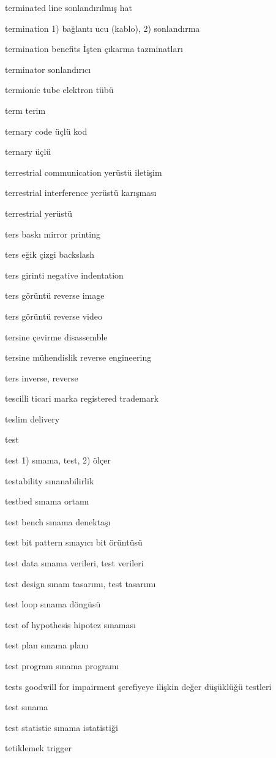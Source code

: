 \documentclass[12pt,fleqn]{article}\usepackage{../../common}
\begin{document}
terminated line sonlandırılmış hat

termination 1) bağlantı ucu (kablo), 2) sonlandırma

termination benefits İşten çıkarma tazminatları

terminator sonlandırıcı

termionic tube elektron tübü

term terim

ternary code üçlü kod

ternary üçlü

terrestrial communication yerüstü iletişim

terrestrial interference yerüstü karışması

terrestrial yerüstü

ters baskı mirror printing

ters eğik çizgi backslash

ters girinti negative indentation

ters görüntü reverse image

ters görüntü reverse video

tersine çevirme disassemble

tersine mühendislik reverse engineering

ters inverse, reverse

tescilli ticari marka registered trademark

teslim delivery

test

test 1) sınama, test, 2) ölçer

testability sınanabilirlik

testbed sınama ortamı

test bench sınama denektaşı

test bit pattern sınayıcı bit örüntüsü

test data sınama verileri, test verileri

test design sınam tasarımı, test tasarımı

test loop sınama döngüsü

test of hypothesis hipotez sınaması

test plan sınama planı

test program sınama programı

tests goodwill for impairment şerefiyeye ilişkin değer düşüklüğü testleri

test sınama

test statistic sınama istatistiği

tetiklemek trigger
\end{document}
